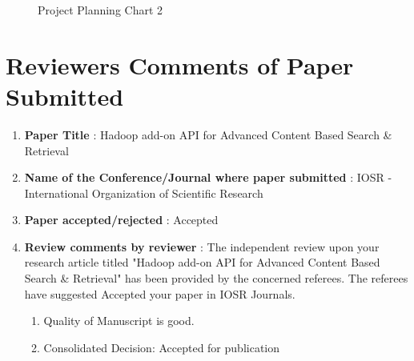 \documentclass[oneside,a4paper,12pt]{report}
\begin{document}
{\begin{appendices}
\begin{center}
	\begin{figure}[!htbp]
		\centering
	  \caption{Project Planning Chart 2}
	  \label{fig:usecase}
	\end{figure}
\end{center} 

\chapter{Reviewers Comments of Paper Submitted}

\begin{enumerate}
\item \textbf{Paper Title } : Hadoop add-on API for Advanced Content Based Search \& Retrieval 
\item \textbf{Name of the Conference/Journal where paper submitted } : IOSR - International Organization of Scientific Research
\item \textbf{Paper accepted/rejected } : Accepted
\item \textbf{Review comments by reviewer} : The independent review upon your research article titled "Hadoop add-on API for Advanced Content Based Search \& Retrieval" has been provided by the concerned referees. The referees have suggested Accepted your paper in IOSR Journals.
	\begin{enumerate}
		\item Quality of Manuscript is good.
		\item Consolidated Decision: Accepted for publication 
	\end{enumerate}
	
\end{enumerate}


\end{appendices}}
\end{document}
